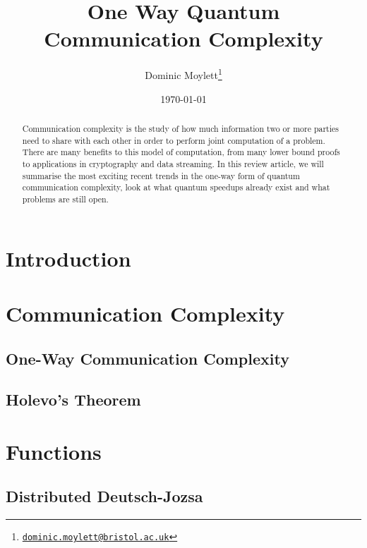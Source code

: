 \documentclass[a4paper]{article}
\begin{document}
    \title{One Way Quantum Communication Complexity}
    \author{Dominic Moylett\thanks{\texttt{\href{dominic.moylett@bristol.ac.uk}{dominic.moylett@bristol.ac.uk}}}}
    \date{\today}
    \maketitle

    \begin{abstract}
        Communication complexity is the study of how much information two or more parties need to share with each other in order to perform joint computation of a problem. There are many benefits to this model of computation, from many lower bound proofs to applications in cryptography and data streaming. In this review article, we will summarise the most exciting recent trends in the one-way form of quantum communication complexity, look at what quantum speedups already exist and what problems are still open.
    \end{abstract}
    
    \section{Introduction}
    
    \section{Communication Complexity}
    
        \subsection{One-Way Communication Complexity}
        
        \subsection{Holevo's Theorem}

    \section{Functions}
    
        \subsection{Distributed Deutsch-Jozsa}
        
\end{document}
